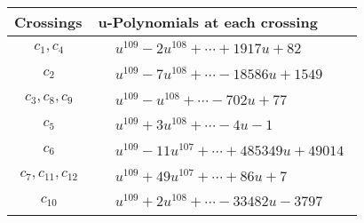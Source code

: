 \documentclass[1p]{elsarticle_modified}
\theoremstyle{definition}
\begin{document}
\begin{tabular}{m{50pt}|m{274pt}}
Crossings & \hspace{64pt}u-Polynomials at each crossing \\
\hline $$\begin{aligned}c_{1},c_{4}\end{aligned}$$&$\begin{aligned}
&u^{109}-2 u^{108}+\cdots+1917 u+82
\end{aligned}$\\
\hline $$\begin{aligned}c_{2}\end{aligned}$$&$\begin{aligned}
&u^{109}-7 u^{108}+\cdots-18586 u+1549
\end{aligned}$\\
\hline $$\begin{aligned}c_{3},c_{8},c_{9}\end{aligned}$$&$\begin{aligned}
&u^{109}- u^{108}+\cdots-702 u+77
\end{aligned}$\\
\hline $$\begin{aligned}c_{5}\end{aligned}$$&$\begin{aligned}
&u^{109}+3 u^{108}+\cdots-4 u-1
\end{aligned}$\\
\hline $$\begin{aligned}c_{6}\end{aligned}$$&$\begin{aligned}
&u^{109}-11 u^{107}+\cdots+485349 u+49014
\end{aligned}$\\
\hline $$\begin{aligned}c_{7},c_{11},c_{12}\end{aligned}$$&$\begin{aligned}
&u^{109}+49 u^{107}+\cdots+86 u+7
\end{aligned}$\\
\hline $$\begin{aligned}c_{10}\end{aligned}$$&$\begin{aligned}
&u^{109}+2 u^{108}+\cdots-33482 u-3797
\end{aligned}$\\
\hline
\end{tabular}\\~\\
\end{document}
